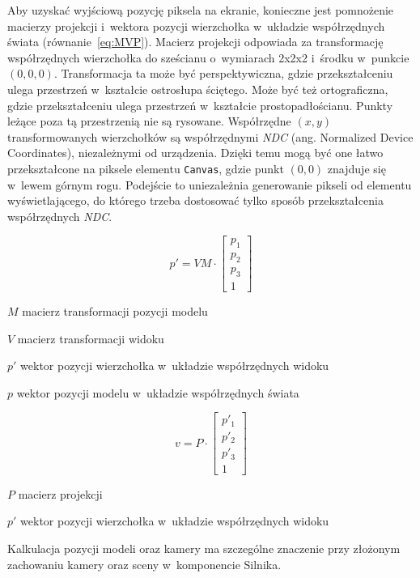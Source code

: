Aby uzyskać wyjściową pozycję piksela na ekranie, konieczne jest pomnożenie macierzy projekcji i~wektora pozycji wierzchołka w~układzie współrzędnych świata (równanie~\ref{eq:MVP}). Macierz projekcji odpowiada za transformację współrzędnych wierzchołka do sześcianu o~wymiarach 2x2x2 i~środku w~punkcie $(0, 0, 0)$. Transformacja ta może być perspektywiczna, gdzie przekształceniu ulega przestrzeń w~kształcie ostrosłupa ściętego. Może być też ortograficzna, gdzie przekształceniu ulega przestrzeń w~kształcie prostopadłościanu. Punkty leżące poza tą przestrzenią nie są rysowane. Współrzędne $(x, y)$ transformowanych wierzchołków są współrzędnymi \textit{NDC} (ang. Normalized Device Coordinates), niezależnymi od urządzenia. Dzięki temu mogą być one łatwo przekształcone na piksele elementu \texttt{Canvas}, gdzie punkt $(0, 0)$ znajduje się w~lewem górnym rogu. Podejście to uniezależnia generowanie pikseli od elementu wyświetlającego, do którego trzeba dostosować tylko sposób przekształcenia współrzędnych \textit{NDC}.

\begin{equation}
    \label{eq:MV}
    p' = VM \cdot \begin{bmatrix}
        p_{1} \\
        p_{2} \\
        p_{3} \\ 
        1
      \end{bmatrix}
\end{equation}
\begin{eqexpl}[25mm]
    \item{$M$} macierz transformacji pozycji modelu
    \item{$V$} macierz transformacji widoku
    \item{$p'$} wektor pozycji wierzchołka w~układzie współrzędnych widoku
    \item{$p$} wektor pozycji modelu w~układzie współrzędnych świata
\end{eqexpl}

\begin{equation}
\label{eq:MVP}
    v = P \cdot \begin{bmatrix}
        p'_{1} \\
        p'_{2} \\
        p'_{3} \\ 
        1
      \end{bmatrix}
\end{equation}
\begin{eqexpl}[25mm]
    \item{$P$} macierz projekcji
    \item{$p'$} wektor pozycji wierzchołka w~układzie współrzędnych widoku
\end{eqexpl}
\vspace{\baselineskip}
Kalkulacja pozycji modeli oraz kamery ma szczególne znaczenie przy złożonym zachowaniu kamery oraz sceny w~komponencie Silnika.

